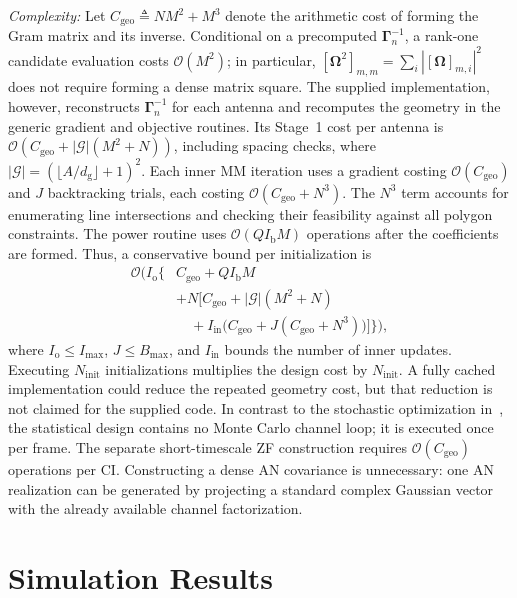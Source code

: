 \documentclass[journal]{IEEEtran}
\newcommand{\bOm}{\boldsymbol{\Omega}}
\newcommand{\bGam}{\boldsymbol{\Gamma}}
\begin{document}
\textit{Complexity:} Let $C_{\mathrm{geo}}\triangleq NM^2+M^3$ denote the arithmetic cost of forming the Gram matrix and its inverse. Conditional on a precomputed $\bGam_n^{-1}$, a rank-one candidate evaluation costs $\mathcal O(M^2)$; in particular, $[\bOm^2]_{m,m}=\sum_i|[\bOm]_{m,i}|^2$ does not require forming a dense matrix square. The supplied implementation, however, reconstructs $\bGam_n^{-1}$ for each antenna and recomputes the geometry in the generic gradient and objective routines. Its Stage~1 cost per antenna is $\mathcal O(C_{\mathrm{geo}}+|\mathcal G|(M^2+N))$, including spacing checks, where $|\mathcal G|=(\lfloor A/d_{\mathrm g}\rfloor+1)^2$. Each inner MM iteration uses a gradient costing $\mathcal O(C_{\mathrm{geo}})$ and $J$ backtracking trials, each costing $\mathcal O(C_{\mathrm{geo}}+N^3)$. The $N^3$ term accounts for enumerating line intersections and checking their feasibility against all polygon constraints. The power routine uses $\mathcal O(QI_{\mathrm b}M)$ operations after the coefficients are formed. Thus, a conservative bound per initialization is
\begin{align*}
\mathcal O\!\Bigg(I_{\mathrm o}\Bigg\{
&C_{\mathrm{geo}}+QI_{\mathrm b}M\\
&+N\Big[C_{\mathrm{geo}}+|\mathcal G|(M^2+N)\\
&\quad+I_{\mathrm{in}}\big(C_{\mathrm{geo}}
  +J(C_{\mathrm{geo}}+N^3)\big)\Big]
\Bigg\}\Bigg),
\end{align*}
where $I_{\mathrm o}\le I_{\mathrm{max}}$, $J\le B_{\mathrm{max}}$, and $I_{\mathrm{in}}$ bounds the number of inner updates. Executing $N_{\mathrm{init}}$ initializations multiplies the design cost by $N_{\mathrm{init}}$. A fully cached implementation could reduce the repeated geometry cost, but that reduction is not claimed for the supplied code. In contrast to the stochastic optimization in~\cite{ZhaoTWC2021}, the statistical design contains no Monte Carlo channel loop; it is executed once per frame. The separate short-timescale ZF construction requires $\mathcal O(C_{\mathrm{geo}})$ operations per CI. Constructing a dense AN covariance is unnecessary: one AN realization can be generated by projecting a standard complex Gaussian vector with the already available channel factorization.

\section{Simulation Results}\label{sec:sim}
\end{document}
